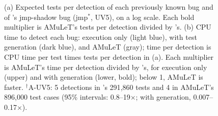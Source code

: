 \begin{figure}[t]
\centering

\caption{(a) Expected tests per detection of each previously known bug and of \toolname{}'s jmp-shadow bug (jmp$^{*}$, UV5), on a log scale. Each bold multiplier is AMuLeT's tests per detection divided by \toolname{}'s. (b) CPU time to detect each bug: \toolname{} execution only (light blue), with test generation (dark blue), and AMuLeT (gray); time per detection is CPU time per test times tests per detection in (a). Each multiplier is AMuLeT's time per detection divided by \toolname{}'s, for execution only (upper) and with generation (lower, bold); below 1, AMuLeT is faster. $^{\dagger}$A-UV5: 5 detections in \toolname{}'s 291{,}860 tests and 4 in AMuLeT's 896{,}000 test cases (95\% intervals: 0.8--19$\times$; with generation, 0.007--0.17$\times$).}
\label{fig:firstdetv2}\label{fig:timedet}
\end{figure}
